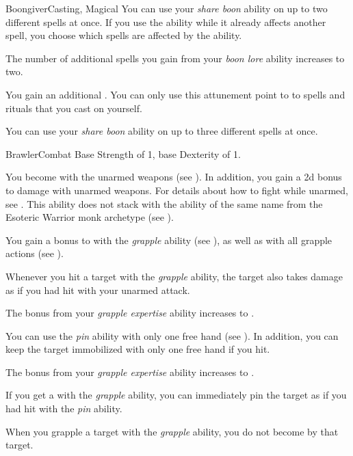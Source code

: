 \begin{feat}{Boongiver}{Casting, Magical}
         You can use your \textit{share boon} ability on up to two different spells at once.
        If you use the ability while it already affects another spell, you choose which spells are affected by the ability.

         The number of additional  spells you gain from your \textit{boon lore} ability increases to two.

         You gain an additional .
        You can only use this attunement point to  to spells and rituals that you cast on yourself.

         You can use your \textit{share boon} ability on up to three different spells at once.
    \end{feat}

    \begin{feat}{Brawler}{Combat}
        \featpre Base Strength of 1, base Dexterity of 1.

         You become  with the unarmed weapons  (see ).
        In addition, you gain a \plus2d bonus to damage with unarmed weapons.
        For details about how to fight while unarmed, see .
        This ability does not stack with the ability of the same name from the Esoteric Warrior monk archetype (see ).

         You gain a  bonus to  with the \textit{grapple} ability (see ), as well as with all grapple actions (see ).

         Whenever you hit a target with the \textit{grapple} ability, the target also takes damage as if you had hit with your unarmed attack.

         The bonus from your \textit{grapple expertise} ability increases to .

         You can use the \textit{pin} ability with only one free hand (see ).
        In addition, you can keep the target immobilized with only one free hand if you hit.

         The bonus from your \textit{grapple expertise} ability increases to .

         If you get a  with the \textit{grapple} ability, you can immediately pin the target as if you had hit with the \textit{pin} ability.

         When you grapple a target with the \textit{grapple} ability, you do not become  by that target.
    \end{feat}

